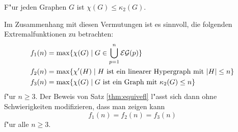 \begin{conjecture}
  F"ur jeden Graphen $G$ ist $\chi(G) \leq \kappa_{2}(G)$. 
  \label{con:eflkrausz}
\end{conjecture}

Im Zusammenhang mit diesen Vermutungen ist es sinnvoll, die folgenden Extremalfunktionen zu betrachten:
\begin{align*}
  f_1(n) &= \max \{\chi(G) \;|\; G\in \bigcup \limits_{p=1}^{n} {\cal EG}(p) \} \\
  f_2(n) &=  \max \{\chi'(H) \;|\; H \text{ ist ein linearer Hypergraph mit } |H| \leq n \} \\
  f_3(n) &= \max \{\chi(G) \;|\; G \text{ ist ein Graph mit }\kappa_{2}(G) \leq n \}
\end{align*}
f"ur $n \geq 3$. 
Der Beweis von Satz \ref{thm:equivefl} l"asst sich dann ohne Schwierigkeiten modifizieren, dass man zeigen kann $$f_1(n) = f_2(n) = f_3(n) $$ f"ur alle $n\geq 3$. 

